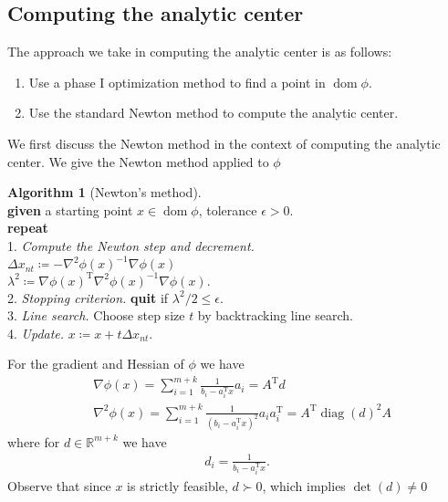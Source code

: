\documentclass[11pt]{amsart}
\theoremstyle{definition}
\newtheorem{algorithm}{Algorithm}[section]
\theoremstyle{remark}
\newcommand{\ind}{\hspace*{0.5cm}}
\newcommand{\transpose}{\text{T}}
\DeclareMathOperator{\domain}{dom}
\DeclareMathOperator{\diag}{diag}
\begin{document}
    \subsection{Computing the analytic center}
        The approach we take in computing the analytic center is as follows:
        \begin{enumerate}
            \item Use a phase I optimization method to find a point in $\domain \phi$.
            \item Use the standard Newton method to compute the analytic center.
        \end{enumerate}
        We first discuss the Newton method in the context of computing the analytic center. We give the Newton method applied to $\phi$
        \begin{algorithm}[Newton's method]
        \label{a:basic_conceptual_cp_alg}\mbox{}\\
            \ind \textbf{given} a starting point $x \in \domain \phi$, tolerance $\epsilon > 0.$ \\
            \ind \textbf{repeat} \\
            \ind\ind 1. \emph{Compute the Newton step and decrement.} \\
            \ind\ind\ind $\Delta x_{nt} \coloneqq -\nabla^2 \phi(x)^{-1} \nabla \phi(x)$ \\
            \ind\ind\ind $\lambda^2 \coloneqq \nabla \phi(x)^\transpose \nabla^2 \phi(x)^{-1} \nabla \phi(x).$ \\
            \ind\ind 2. \emph{Stopping criterion.} \textbf{quit} if $\lambda^2/2 \leq \epsilon.$\\
            \ind\ind 3. \emph{Line search.} Choose step size $t$ by backtracking line search. \\
            \ind\ind 4. \emph{Update.} $x \coloneqq x + t\Delta x_{nt}.$ \\
        \end{algorithm} 
        For the gradient and Hessian of $\phi$ we have
        \begin{align}
            &\nabla \phi(x) = \sum_{i=1}^{m+k} \frac{1}{b_i - a_i^\transpose x}a_i = A^\transpose d \\
            &\nabla^2 \phi(x) = \sum_{i=1}^{m+k} \frac{1}{(b_i - a_i^\transpose x)^2}a_i a_i^\transpose = A^\transpose \diag(d)^2 A
        \end{align}
        where for $d \in \mathbb{R}^{m+k}$ we have
        \begin{align*}
            d_i = \frac{1}{b_i - a_i^\transpose x}.
        \end{align*}
        Observe that since $x$ is strictly feasible, $d \succ 0$, which implies $\det(d) \neq 0$ 
\end{document}
